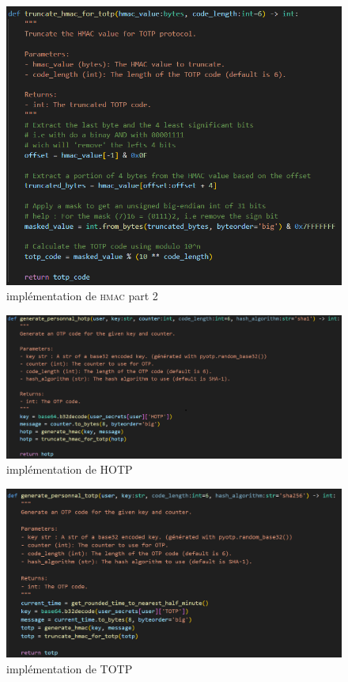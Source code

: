 \documentclass[a4paper, 10pt]{article}
\newcommand{\totp}{\textsc{TOTP} }
\newcommand{\hotp}{\textsc{HOTP} }
\newcommand{\hmac}{\textsc{hmac} }
\begin{document}
\begin{figure}[H]
        \centering
        \includegraphics[scale=1]{img/C_proto/code/code_trunc.png}
        \caption{implémentation de \hmac part 2\\}
        \label{fig:code-trunc}
\end{figure}

\begin{figure}[H]
        \centering
        \includegraphics[scale=0.7]{img/C_proto/code/code_hotp.png}
        \caption{implémentation de \hotp\\}
        \label{fig:code-hotp}
\end{figure}

\begin{figure}[H]
        \centering
        \includegraphics[scale=0.7]{img/C_proto/code/code_totp.png}
        \caption{implémentation de \totp\\}
        \label{fig:code-totp}
\end{figure}
\end{document}
